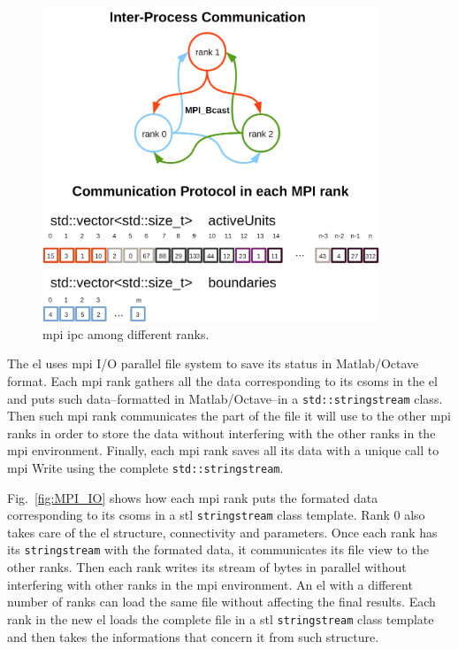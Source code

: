 {\begin{figure}[h!]
    \centering
    \includegraphics[width=0.9\textwidth]{BCast.png}
    \caption{\gls{mpi} \gls{ipc} among different ranks.}
    \label{fig:BCast}
\end{figure}

The \gls{el} uses \gls{mpi} I/O parallel file system to save its status in Matlab/Octave format. Each \gls{mpi} rank gathers all the data corresponding to its \glspl{csom} in the \gls{el} and puts such data--formatted in Matlab/Octave--in a \texttt{std::stringstream} class. Then such \gls{mpi} rank communicates the part of the file it will use to the other \gls{mpi} ranks in order to store the data without interfering with the other ranks in the \gls{mpi} environment. Finally, each \gls{mpi} rank saves all its data with a unique call to \gls{mpi} Write using the complete \texttt{std::stringstream}.

Fig.~\ref{fig:MPI_IO} shows how each \gls{mpi} rank puts the formated data corresponding to its \glspl{csom} in a \gls{stl} \texttt{stringstream} class template. Rank 0 also takes care of the \gls{el} structure, connectivity and parameters. Once each rank has its \texttt{stringstream} with the formated data, it communicates its file view to the other ranks. Then each rank writes its stream of bytes in parallel without interfering with other ranks in the \gls{mpi} environment. An \gls{el} with a different number of ranks can load the same file without affecting the final results. Each rank in the new \gls{el} loads the complete file in a \gls{stl} \texttt{stringstream} class template and then takes the informations that concern it from such structure.

}
